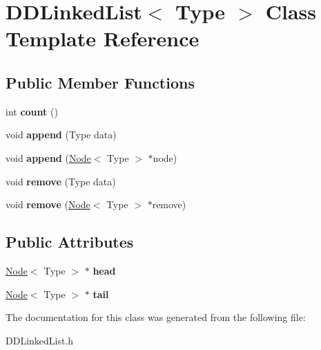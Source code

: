 \hypertarget{class_d_d_linked_list}{}\section{D\+D\+Linked\+List$<$ Type $>$ Class Template Reference}
\label{class_d_d_linked_list}
\subsection*{Public Member Functions}
\begin{DoxyCompactItemize}
\item 
\mbox{\label{class_d_d_linked_list_ac71de6448e246a49682db52b4f9db49f}} 
int {\bfseries count} ()
\item 
\mbox{\label{class_d_d_linked_list_a545e4d81e9d86b80dfda3c0dd5589ff7}} 
void {\bfseries append} (Type data)
\item 
\mbox{\label{class_d_d_linked_list_a39627249e8fd24249e152967e1988dd5}} 
void {\bfseries append} (\mbox{\hyperlink{class_node}{Node}}$<$ Type $>$ $\ast$node)
\item 
\mbox{\label{class_d_d_linked_list_abe5ea588678c869a4bb511f9f10622a3}} 
void {\bfseries remove} (Type data)
\item 
\mbox{\label{class_d_d_linked_list_afcc8260230b0814e03b1918d6fb452e2}} 
void {\bfseries remove} (\mbox{\hyperlink{class_node}{Node}}$<$ Type $>$ $\ast$remove)
\end{DoxyCompactItemize}
\subsection*{Public Attributes}
\begin{DoxyCompactItemize}
\item 
\mbox{\label{class_d_d_linked_list_a0749288fb8a7c4059cdd8b53759386ec}} 
\mbox{\hyperlink{class_node}{Node}}$<$ Type $>$ $\ast$ {\bfseries head}
\item 
\mbox{\label{class_d_d_linked_list_a7f319683d77c3324cc0b53f901baedbd}} 
\mbox{\hyperlink{class_node}{Node}}$<$ Type $>$ $\ast$ {\bfseries tail}
\end{DoxyCompactItemize}


The documentation for this class was generated from the following file\+:\begin{DoxyCompactItemize}
\item 
D\+D\+Linked\+List.\+h\end{DoxyCompactItemize}
